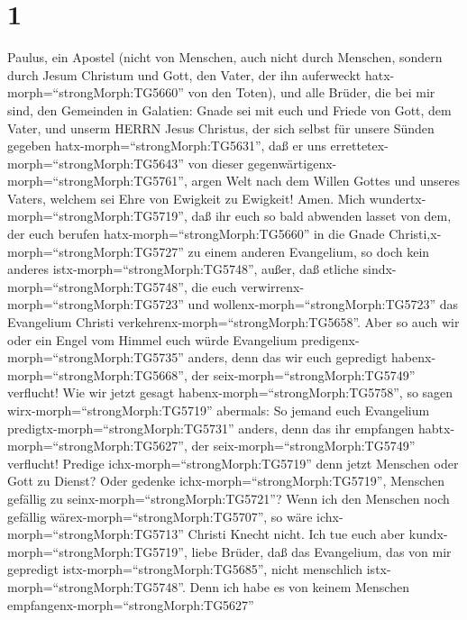 \hypertarget{section}{%
\section{1}\label{section}}

 Paulus, ein Apostel (nicht von Menschen, auch nicht durch
Menschen, sondern durch Jesum Christum und Gott, den Vater, der ihn
auferweckt hatx-morph=``strongMorph:TG5660'' von den Toten),
 und alle Brüder, die bei mir sind, den Gemeinden in
Galatien:  Gnade sei mit euch und Friede von Gott, dem
Vater, und unserm HERRN Jesus Christus,  der sich selbst für
unsere Sünden gegeben hatx-morph=``strongMorph:TG5631'', daß er uns
errettetex-morph=``strongMorph:TG5643'' von dieser
gegenwärtigenx-morph=``strongMorph:TG5761'', argen Welt nach dem Willen
Gottes und unseres Vaters,  welchem sei Ehre von Ewigkeit zu
Ewigkeit! Amen.  Mich wundertx-morph=``strongMorph:TG5719'',
daß ihr euch so bald abwenden lasset von dem, der euch berufen
hatx-morph=``strongMorph:TG5660'' in die Gnade
Christi,x-morph=``strongMorph:TG5727'' zu einem anderen Evangelium,
 so doch kein anderes istx-morph=``strongMorph:TG5748'',
außer, daß etliche sindx-morph=``strongMorph:TG5748'', die euch
verwirrenx-morph=``strongMorph:TG5723'' und
wollenx-morph=``strongMorph:TG5723'' das Evangelium Christi
verkehrenx-morph=``strongMorph:TG5658''.  Aber so auch wir
oder ein Engel vom Himmel euch würde Evangelium
predigenx-morph=``strongMorph:TG5735'' anders, denn das wir euch
gepredigt habenx-morph=``strongMorph:TG5668'', der
seix-morph=``strongMorph:TG5749'' verflucht!  Wie wir jetzt
gesagt habenx-morph=``strongMorph:TG5758'', so sagen
wirx-morph=``strongMorph:TG5719'' abermals: So jemand euch Evangelium
predigtx-morph=``strongMorph:TG5731'' anders, denn das ihr empfangen
habtx-morph=``strongMorph:TG5627'', der
seix-morph=``strongMorph:TG5749'' verflucht!  Predige
ichx-morph=``strongMorph:TG5719'' denn jetzt Menschen oder Gott zu
Dienst? Oder gedenke ichx-morph=``strongMorph:TG5719'', Menschen
gefällig zu seinx-morph=``strongMorph:TG5721''? Wenn ich den Menschen
noch gefällig wärex-morph=``strongMorph:TG5707'', so wäre
ichx-morph=``strongMorph:TG5713'' Christi Knecht nicht. 
Ich tue euch aber kundx-morph=``strongMorph:TG5719'', liebe Brüder, daß
das Evangelium, das von mir gepredigt istx-morph=``strongMorph:TG5685'',
nicht menschlich istx-morph=``strongMorph:TG5748''.  Denn
ich habe es von keinem Menschen empfangenx-morph=``strongMorph:TG5627''

